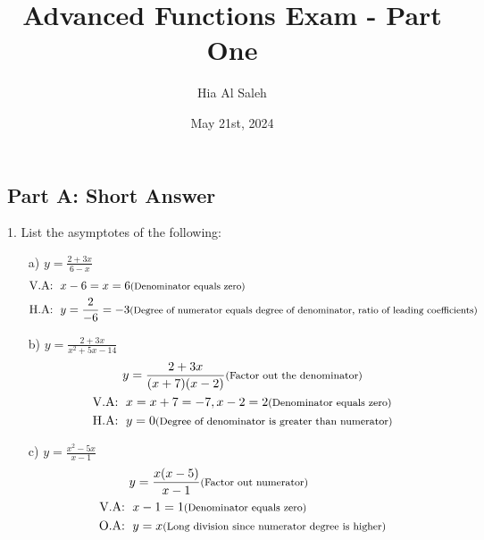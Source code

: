 \documentclass{article}
\title{Advanced Functions Exam - Part One}
\author{Hia Al Saleh}
\date{May 21st, 2024}
\newcommand{\smalltext}[1]{\text{\footnotesize #1}}
\begin{document}
\maketitle

\subsection*{Part A: Short Answer}
1. List the asymptotes of the following:
\begin{enumerate}
    \item[a)] \( y = \frac{2 + 3x}{6 - x} \)
    \begin{align*}
        \text{V.A: } & \; x-6 = x = 6 \smalltext{ (Denominator equals zero)} \\
        \text{H.A: } & \; y = \frac{2}{-6} = -3 \smalltext{ (Degree of numerator equals degree of denominator, ratio of leading coefficients)}
    \end{align*}
    \item[b)] \( y = \frac{2 + 3x}{x^2 + 5x - 14} \)
    \begin{align*}
        &y = \frac{2 + 3x}{(x + 7)(x - 2)} \smalltext{ (Factor out the denominator)} \\
        \text{V.A: } & \; x = x + 7= -7, x-2= 2 \smalltext{ (Denominator equals zero)} \\
        \text{H.A: } & \; y = 0 \smalltext{ (Degree of denominator is greater than numerator)}
    \end{align*}
    \item[c)] \( y = \frac{x^2 - 5x}{x - 1} \)
    \begin{align*}
        &y = \frac{x(x - 5)}{x - 1} \smalltext{ (Factor out numerator)} \\
        \text{V.A: } & \; x -1 = 1 \smalltext{ (Denominator equals zero)} \\
        \text{O.A: } & \; y = x \smalltext{ (Long division since numerator degree is higher)}
    \end{align*}
\end{enumerate}
\end{document}
